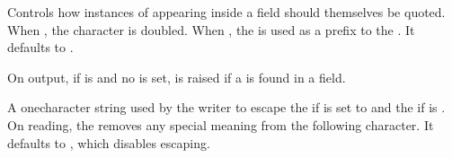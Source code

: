 \documentclass[letterpaper,10pt,english]{sphinxmanual}
\begin{document}

\vspace{5px}

\begin{fulllineitems}
\label{\detokenize{csv:csv.Dialect.doublequote}}
Controls how instances of  appearing inside a field should
themselves be quoted.  When , the character is doubled. When
, the  is used as a prefix to the .  It
defaults to .

On output, if  is  and no  is set,
{\hyperref[\detokenize{csv:csv.Error}]{}} is raised if a  is found in a field.

\end{fulllineitems}


\vspace{5px}

\begin{fulllineitems}
\label{\detokenize{csv:csv.Dialect.escapechar}}
A one\sphinxhyphen{}character string used by the writer to escape the  if 
is set to {\hyperref[\detokenize{csv:csv.QUOTE_NONE}]{}} and the  if  is
. On reading, the  removes any special meaning from
the following character. It defaults to , which disables escaping.

\end{fulllineitems}


\vspace{5px}
\end{document}
